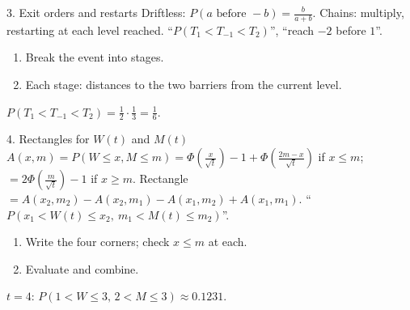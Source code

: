 \begin{card}{3. Exit orders and restarts}
\Formula
Driftless: $P(a\text{ before }-b)=\frac{b}{a+b}$. Chains: multiply, restarting at each level reached.
\UseWhen
``$P(T_1<T_{-1}<T_2)$'', ``reach $-2$ before $1$''.
\HowTo
\begin{enumerate}
  \item Break the event into stages.
  \item Each stage: distances to the two barriers from the current level.
\end{enumerate}
\Caveats
{}
\begin{cardex}
$P(T_1<T_{-1}<T_2)=\frac12\cdot\frac13=\frac16$.
\end{cardex}
\end{card}

\begin{card}{4. Rectangles for \texorpdfstring{$W(t)$}{W(t)} and \texorpdfstring{$M(t)$}{M(t)}}
\Formula
$A(x,m)=P(W\le x,M\le m)=\Phi(\frac x{\sqrt t})-1+\Phi(\frac{2m-x}{\sqrt t})$ if $x\le m$; $=2\Phi(\frac m{\sqrt t})-1$ if $x\ge m$. Rectangle $=A(x_2,m_2)-A(x_2,m_1)-A(x_1,m_2)+A(x_1,m_1)$.
\UseWhen
``$P(x_1<W(t)\le x_2,\ m_1<M(t)\le m_2)$''.
\HowTo
\begin{enumerate}
  \item Write the four corners; check $x\le m$ at each.
  \item Evaluate and combine.
\end{enumerate}
\Caveats
{}
\begin{cardex}
$t=4$: $P(1<W\le3,\,2<M\le3)\approx0.1231$.
\end{cardex}
\end{card}
